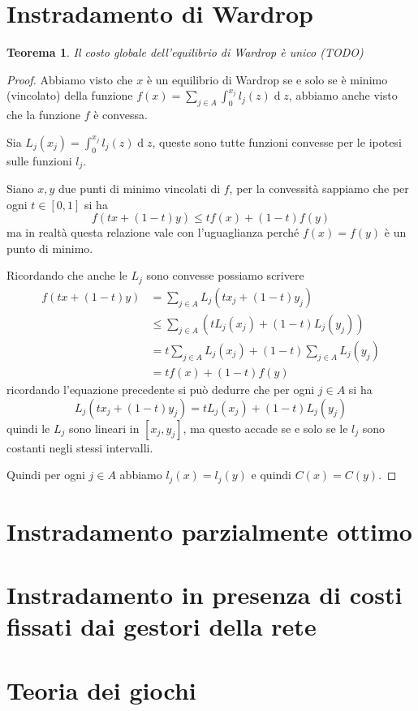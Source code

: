 \documentclass[a4paper]{article}
\newcounter{counter1}
\theoremstyle{plain}
\newtheorem{myteo}[counter1]{Teorema}
\theoremstyle{definition}
\theoremstyle{remark}
\newcommand{\pa}[1]{\left(#1\right)}
\newcommand{\bra}[1]{\left[#1\right]}
\DeclareMathOperator{\de}{d}
\begin{document}
\section{Instradamento di Wardrop}


\begin{myteo}
  Il costo globale dell'equilibrio di Wardrop è unico (TODO)
\end{myteo}
\begin{proof}
  Abbiamo visto che $x$ è un equilibrio di Wardrop se e solo se è
  minimo (vincolato) della funzione $f(x) = \sum _{j\in A} \int _0
  ^{x_j} l_j(z)\de z$, abbiamo anche visto che la funzione $f$ è
  convessa.

  Sia $L_j(x_j) = \int _0 ^{x_j} l_j(z)\de z$, queste sono tutte
  funzioni convesse per le ipotesi sulle funzioni $l_j$.

  Siano $x,y$ due punti di minimo vincolati di $f$, per la convessità
  sappiamo che per ogni $t\in\bra{0,1}$ si ha
  \[ f\pa{ tx + (1-t)y} \le tf(x) + (1-t)f(y) \]
  ma in realtà questa relazione vale con l'uguaglianza perché
  $f(x)=f(y)$ è un punto di minimo.

  Ricordando che anche le $L_j$ sono convesse possiamo scrivere
  \begin{align*}
    f\pa{ tx + (1-t)y} & = \sum _{j\in A} L_j\pa{tx_j + (1-t)y_j} \\
    & \le \sum _{j\in A} \pa{ tL_j(x_j) + (1-t)L_j(y_j)} \\
    & = t \sum _{j\in A} L_j(x_j) + (1-t)\sum _{j\in A} L_j(y_j) \\
    & = tf(x) + (1-t)f(y)
  \end{align*}
  ricordando l'equazione precedente si può dedurre che per ogni $j\in
  A$ si ha
  \[ L_j\pa{tx_j + (1-t)y_j} = tL_j(x_j) + (1-t)L_j(y_j) \]
  quindi le $L_j$ sono lineari in $\bra{x_j,y_j}$, ma questo accade se
  e solo se le $l_j$ sono costanti negli stessi intervalli.

  Quindi per ogni $j\in A$ abbiamo $l_j(x) = l_j(y)$ e quindi $C(x) = C(y)$.  
\end{proof}

\section{Instradamento parzialmente ottimo}

\section{Instradamento in presenza di costi fissati dai gestori della rete}

\appendix

\section{Teoria dei giochi}

\cite{menache2011network}




\end{document}
